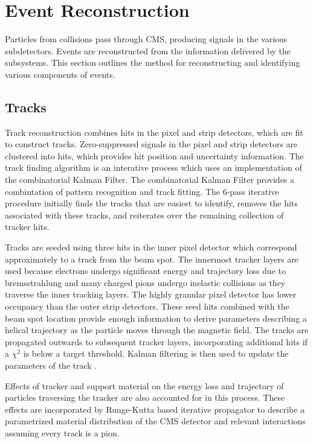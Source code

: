 \chapter{Event Reconstruction}\label{ch:reco}
Particles from collisions pass through CMS, producing signals in the various subdetectors. Events are reconstructed from the information delivered by the subsystems. This section outlines the method for reconstructing and identifying various components of events.

\section{Tracks}
Track reconstruction combines hits in the pixel and strip detectors, which are fit to construct tracks. Zero-suppressed signals in the pixel and strip detectors are clustered into hits, which provides hit position and uncertainty information. The track finding algorithm is an interative process which uses an implementation of the combinatorial Kalman Filter. The combinatorial Kalman Filter provides a combintation of pattern recognition and track fitting. The 6-pass iterative procedure initially finds the tracks that are easiest to identify, removes the hits associated with these tracks, and reiterates over the remaining collection of tracker hits. \cite{Chatrchyan:2014fea}

 Tracks are seeded using three hits in the inner pixel detector which correspond approximately to a track from the beam spot. The innermost tracker layers are used because electrons undergo significant energy and trajectory loss due to bremsstrahlung and many charged pions undergo inelastic collisions as they traverse the inner tracking layers. The highly granular pixel detector has lower occupancy than the outer strip detectors. These seed hits combined with the beam spot location provide enough information to derive parameters describing a helical trajectory as the particle moves through the magnetic field. The tracks are propagated outwards to subsequent tracker layers, incorporating additional hits if a $\chi^2$ is below a target threshold. Kalman filtering is then used to update the parameters of the track \cite{Adam:2005cg}. 

Effects of tracker and support material on the energy loss and trajectory of particles traversing the tracker are also accounted for in this process. These effects are incorporated by Runge-Kutta based iterative propagator to describe a parametrized material distribution of the CMS detector and relevant interactions assuming every track is a pion. 

